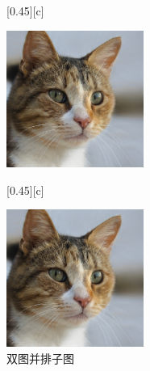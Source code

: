 \documentclass[12pt,a4paper,UTF8]{article}
\begin{document}
    \begin{figure}[!htbp]
        \centering
        [0.45\textwidth][c]{
            \centering
            \includegraphics[width=0.4\textwidth]{example}
             
        }%
        \hspace{0.5cm} 
        [0.45\textwidth][c]{
            \centering
            \includegraphics[width=0.4\textwidth]{example}
             
        } 
        \caption{双图并排子图}
         
    \end{figure}
\end{document}
